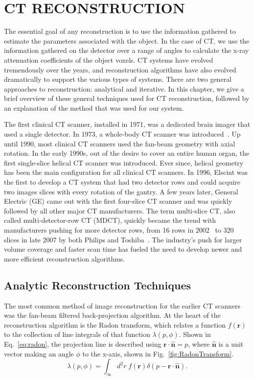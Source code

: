 \chapter{CT RECONSTRUCTION}
\label{chap:reconstruction}

The essential goal of any reconstruction is to use the information gathered to estimate the parameters associated with the object.  In the case of CT, we use the information gathered on the detector over a range of angles to calculate the x-ray attenuation coefficients of the object voxels.  CT systems have evolved tremendously over the years, and reconstruction algorithms have also evolved dramatically to support the various types of systems. There are two general approaches to reconstruction: analytical and iterative.  In this chapter, we give a brief overview of these general techniques used for CT reconstruction, followed by an explanation of the method that was used for our system.

The first clinical CT scanner, installed in 1971, was a dedicated brain imager that used a single detector.  In 1973, a whole-body CT scanner was introduced~\citep{Ulzheimer2009}.  Up until 1990, most clinical CT scanners used the fan-beam geometry with axial rotation.  In the early 1990s, out of the desire to cover an entire human organ, the first single-slice helical CT scanner was introduced.  Ever since, helical geometry has been the main configuration for all clinical CT scanners.  In 1996, Elscint was the first to develop a CT system that had two detector rows and could acquire two images slices with every rotation of the gantry.  A few years later, General Electric (GE) came out with the first four-slice CT scanner and was quickly followed by all other major CT manufacturers.  The term multi-slice CT, also called multi-detector-row CT (MDCT), quickly became the trend with manufacturers pushing for more detector rows, from 16 rows in 2002~\citep{Impact2002} to 320 slices in late 2007 by both Philips and Toshiba~\citep{Ulzheimer2009}.  The industry's push for larger volume coverage and faster scan time has fueled the need to develop newer and more efficient reconstruction algorithms.

\section{Analytic Reconstruction Techniques}

The most common method of image reconstruction for the earlier CT scanners was the fan-beam filtered back-projection algorithm.  At the heart of the reconstruction algorithm is the Radon transform, which relates a function $f(\mathbf{r})$ to the collection of line integrals of that function $\lambda(p, \phi)$.  Shown in Eq.~\ref{eq:radon}, the projection line is described using $\mathbf{r \cdot \hat{n}} = p$, where $\mathbf{\hat{n}}$ is a unit vector making an angle $\phi$ to the x-axis, shown in Fig.~\ref{fig:RadonTransform}.  
%
\begin{equation}
\lambda(p, \phi) = \int_\infty d^2r \; f(\mathbf{r}) \delta(p- \mathbf{r} \cdot \mathbf{\hat{n}}).
\label{eq:radon}
\end{equation}

